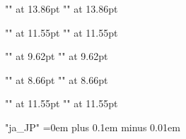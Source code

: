 {      %
      \font\chapmczzz"\txijamcfont" at 13.86pt
      \font\chapgtzzz"\txijagtfont" at 13.86pt
      \def\chapmc{\setjafont\chapmczzz}
      \def\chapgt{\setjafont\chapgtzzz}

      \font\secmczzz"\txijamcfont" at 11.55pt
      \font\secgtzzz"\txijagtfont" at 11.55pt
      \def\secmc{\setjafont\secmczzz}
      \def\secgt{\setjafont\secgtzzz}

      \font\ssecmczzz"\txijamcfont" at 9.62pt
      \font\ssecgtzzz"\txijagtfont" at 9.62pt
      \def\ssecmc{\setjafont\ssecmczzz}
      \def\ssecgt{\setjafont\ssecgtzzz}

      \font\reducedmczzz"\txijamcfont" at 8.66pt
      \font\reducedgtzzz"\txijagtfont" at 8.66pt
      \def\reducedmc{\setjafont\reducedmczzz}
      \def\reducedgt{\setjafont\reducedgtzzz}

      \font\shortcontmczzz"\txijamcfont" at 11.55pt
      \font\shortcontgtzzz"\txijagtfont" at 11.55pt
      \def\shortcontmc{\setjafont\shortcontmczzz}
      \def\shortcontgt{\setjafont\shortcontgtzzz}

    }

    \XeTeXlinebreaklocale "ja_JP"
    \XeTeXlinebreakskip=0em plus 0.1em minus 0.01em

    \ifx\XeTeXgenerateactualtext\thisisundefined
    \else
    \fi

  \fi %

  \iftxinativeunicodecapable


    \let\alphabeticrm\rm
    \gdef\rm{\alphabeticrm\tenmc}

    \let\alphabeticit\it
    \gdef\it{\alphabeticit\tenmc}

    \let\alphabeticsl\sl
    \gdef\sl{\alphabeticsl\tengt}

    \let\alphabeticbf\bf
    \gdef\bf{\alphabeticbf\tengt}

    \let\alphabetictt\tt
    \gdef\tt{\alphabetictt\tengt}


    \let\alphabetictextfonts\textfonts
    \gdef\textfonts{%
      \alphabetictextfonts
      \let\tenmc\textmc
      \let\tengt\textgt
    }

